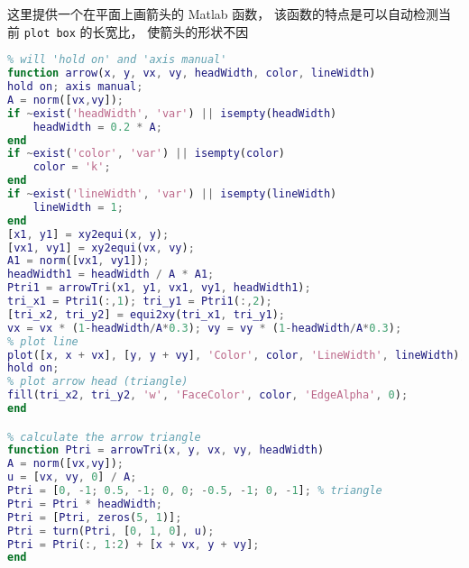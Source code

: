
\begin{issues}
\issueDraft
\end{issues}


这里提供一个在平面上画箭头的 Matlab 函数， 该函数的特点是可以自动检测当前 \verb|plot box| 的长宽比， 使箭头的形状不因

\begin{lstlisting}[language=matlab]
% plot arrow without distortion by getting current aspect ratio
% will 'hold on' and 'axis manual'
function arrow(x, y, vx, vy, headWidth, color, lineWidth)
hold on; axis manual;
A = norm([vx,vy]);
if ~exist('headWidth', 'var') || isempty(headWidth)
    headWidth = 0.2 * A;
end
if ~exist('color', 'var') || isempty(color)
    color = 'k';
end
if ~exist('lineWidth', 'var') || isempty(lineWidth)
    lineWidth = 1;
end
[x1, y1] = xy2equi(x, y);
[vx1, vy1] = xy2equi(vx, vy);
A1 = norm([vx1, vy1]);
headWidth1 = headWidth / A * A1;
Ptri1 = arrowTri(x1, y1, vx1, vy1, headWidth1);
tri_x1 = Ptri1(:,1); tri_y1 = Ptri1(:,2);
[tri_x2, tri_y2] = equi2xy(tri_x1, tri_y1);
vx = vx * (1-headWidth/A*0.3); vy = vy * (1-headWidth/A*0.3);
% plot line
plot([x, x + vx], [y, y + vy], 'Color', color, 'LineWidth', lineWidth);
hold on;
% plot arrow head (triangle)
fill(tri_x2, tri_y2, 'w', 'FaceColor', color, 'EdgeAlpha', 0);
end

% calculate the arrow triangle
function Ptri = arrowTri(x, y, vx, vy, headWidth)
A = norm([vx,vy]);
u = [vx, vy, 0] / A;
Ptri = [0, -1; 0.5, -1; 0, 0; -0.5, -1; 0, -1]; % triangle
Ptri = Ptri * headWidth;
Ptri = [Ptri, zeros(5, 1)];
Ptri = turn(Ptri, [0, 1, 0], u);
Ptri = Ptri(:, 1:2) + [x + vx, y + vy];
end
\end{lstlisting}
